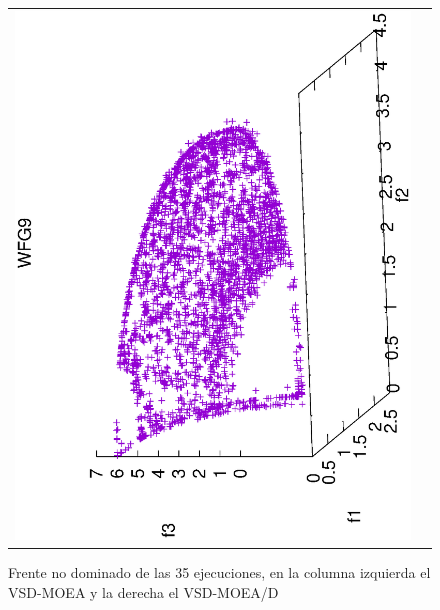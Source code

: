 \begin{figure}[H]
\centering
\scriptsize
\caption{Frente no dominado de las 35 ejecuciones, en la columna izquierda el VSD-MOEA y la derecha el VSD-MOEA/D}%
\begin{tabular}{cc}
  \includegraphics[scale=0.3, angle=-90,origin=c]{Figures_Chapter7/Results_Chapter4/Summary_Representative/VSD-MOEA/WFG9.eps} &

\end{tabular}
\end{figure}
